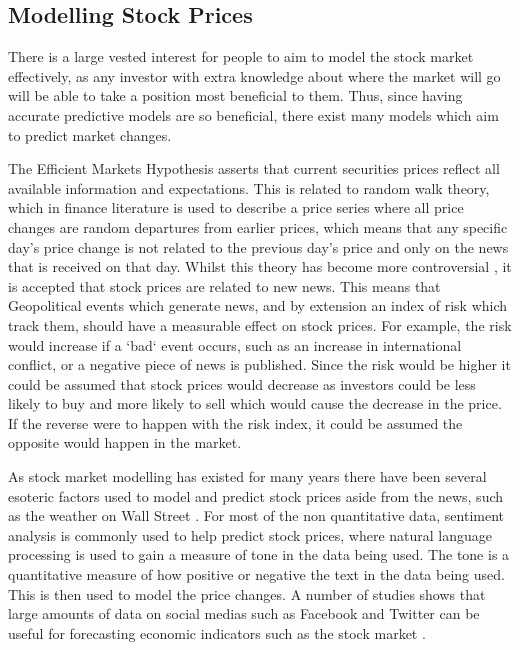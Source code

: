 \subsection{Modelling Stock Prices}
There is a large vested interest for people to aim to model the stock market effectively, as any investor with extra knowledge about where the market will go will be able to take a position most beneficial to them. Thus, since having accurate predictive models are so beneficial, there exist many models which aim to predict market changes.

The Efficient Markets Hypothesis asserts that current securities prices reflect all available information and expectations\cite{fama1960efficient}. This is related to random walk theory, which in finance literature is used to describe a price series where all price changes are random departures from earlier prices, which means that any specific day's price change is not related to the previous day's price and only on the news that is received on that day. Whilst this theory has become more controversial \cite{malkiel2003efficient}, it is accepted that stock prices are related to new news. This means that Geopolitical events which generate news, and by extension an index of risk which track them, should have a measurable effect on stock prices. For example, the risk would increase if a `bad` event occurs, such as an increase in international conflict, or a negative piece of news is published. Since the risk would be higher it could be assumed that stock prices would decrease as investors could be less likely to buy and more likely to sell which would cause the decrease in the price. If the reverse were to happen with the risk index, it could be assumed the opposite would happen in the market.

As stock market modelling has existed for many years there have been several esoteric factors used to model and predict stock prices aside from the news, such as the weather on Wall Street \cite{saunders1993stock}. For most of the non quantitative data, sentiment analysis is commonly used to help predict stock prices, where natural language processing is used to gain a measure of tone in the data being used. The tone is a quantitative measure of how positive or negative the text in the data being used. This is then used to model the price changes. A number of studies shows that large amounts of data on social medias such as Facebook and Twitter can be useful for forecasting economic indicators such as the stock market \cite{bollen2011twitter} \cite{arias2014forecasting}. 

